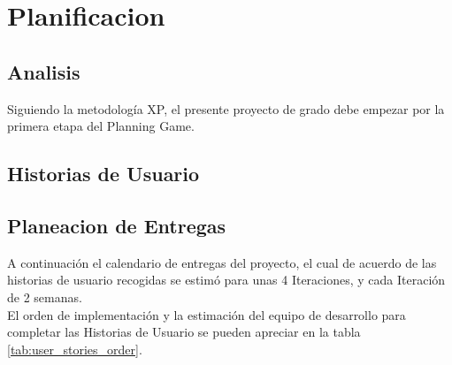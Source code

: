   \chapter{Planificacion}
  \label{chap:caso_estudio}

    \section{Analisis}
    \label{sec:Analisis}


  Siguiendo la metodología XP, el presente proyecto de grado debe empezar por la primera etapa del Planning Game.\\



    \section{Historias de Usuario}
    \label{sec:historias_de_usuario}

      


    \section{Planeacion de Entregas}
    \label{sub:Planeacion de Entregas}

        A continuación el calendario de entregas del proyecto, el cual de acuerdo de las historias de usuario recogidas se estimó para unas 4 Iteraciones, y cada Iteración de 2 semanas.\\

        

        El orden de implementación y la estimación del equipo de desarrollo para completar las Historias de Usuario se pueden apreciar en la tabla \ref{tab:user_stories_order}.

